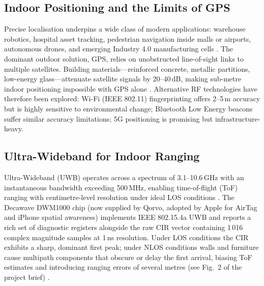 \documentclass[conference]{IEEEtran}
\begin{document}
\subsection{Indoor Positioning and the Limits of GPS}
Precise localisation underpins a wide class of modern applications: warehouse robotics,
hospital asset tracking, pedestrian navigation inside malls or airports, autonomous drones,
and emerging Industry 4.0 manufacturing cells \cite{zafari2019survey}. The dominant
outdoor solution, GPS, relies on unobstructed line-of-sight links to multiple satellites.
Building materials---reinforced concrete, metallic partitions, low-energy glass---attenuate
satellite signals by 20--40\,dB, making sub-metre indoor positioning impossible with GPS
alone \cite{liu2007survey}. Alternative RF technologies have therefore been explored:
Wi-Fi (IEEE 802.11) fingerprinting offers 2--5\,m accuracy but is highly sensitive to
environmental change; Bluetooth Low Energy beacons suffer similar accuracy limitations;
5G positioning is promising but infrastructure-heavy.

\subsection{Ultra-Wideband for Indoor Ranging}
Ultra-Wideband (UWB) operates across a spectrum of 3.1--10.6\,GHz with an instantaneous
bandwidth exceeding 500\,MHz, enabling time-of-flight (ToF) ranging with centimetre-level
resolution under ideal LOS conditions \cite{gezici2005localization}. The Decawave
DWM1000 chip (now supplied by Qorvo, adopted by Apple for AirTag and iPhone spatial
awareness) implements IEEE 802.15.4a UWB and reports a rich set of diagnostic registers
alongside the raw CIR vector containing 1\,016 complex magnitude samples at 1\,ns
resolution. Under LOS conditions the CIR exhibits a sharp, dominant first peak; under
NLOS conditions walls and furniture cause multipath components that obscure or delay
the first arrival, biasing ToF estimates and introducing ranging errors of several metres
(see Fig.~2 of the project brief) \cite{wymeersch2012machine}.
\end{document}
